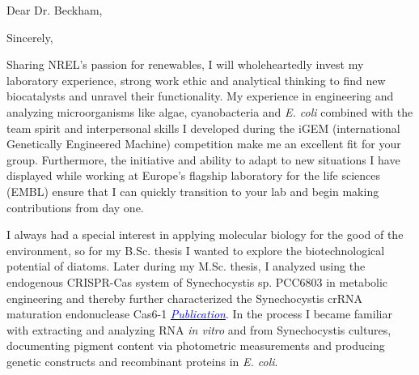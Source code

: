 \documentclass[11pt,a4paper,sans]{moderncv}
\begin{document}
\date{\today}
\opening{Dear Dr.  Beckham,}
\closing{Sincerely,}
\makelettertitle
\begin{spacing}{1.15}


Sharing NREL's passion for renewables, I will wholeheartedly invest my laboratory experience, strong work ethic and analytical thinking to find new biocatalysts and unravel their functionality.
My experience in engineering and analyzing microorganisms like algae, cyanobacteria and \textit{E. coli} combined with the team spirit and interpersonal skills I developed during the iGEM (international Genetically Engineered Machine) competition make me an excellent fit for your group. 
Furthermore, the initiative and ability to adapt to new situations I have displayed while working at Europe's flagship laboratory for the life sciences (EMBL) ensure that I can quickly transition to your lab and begin making contributions from day one.\par\vspace*{3mm}

I always had a special interest in applying molecular biology for the good of the environment, so for my B.Sc. thesis I wanted to explore the biotechnological potential of diatoms. 
Later during my M.Sc. thesis, I analyzed using the endogenous CRISPR-Cas system of Synechocystis sp. PCC6803 in metabolic engineering and thereby further characterized the Synechocystis crRNA maturation endonuclease Cas6-1
{\href{https://www.tandfonline.com/eprint/vmAQ3vjYGdZIZpIKQTIT/full}{\textcolor{blue}{{\textit{Publication}}}}}.
In the process I became familiar with extracting and analyzing RNA \textit{in vitro} and from Synechocystis cultures, documenting pigment content via photometric measurements and producing genetic constructs and recombinant proteins in \textit{E. coli}.
\par\vspace*{3mm}
 

\end{spacing}
\end{document}
